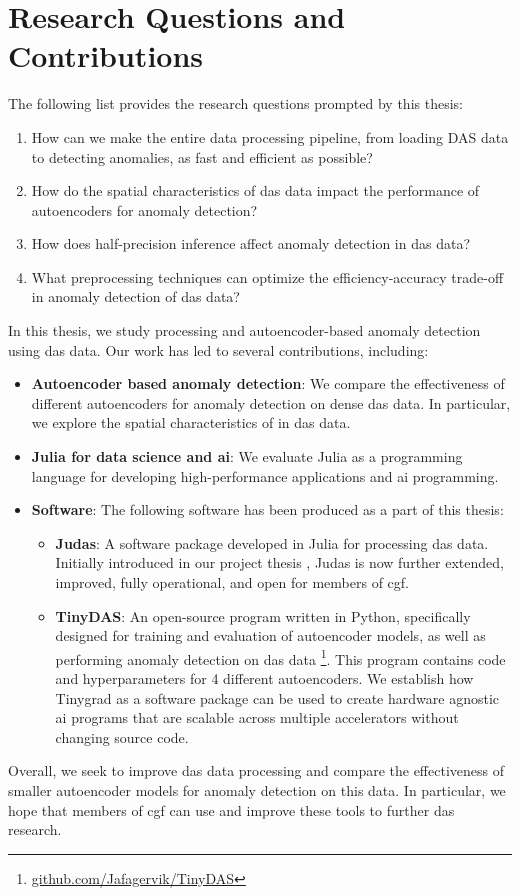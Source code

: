 \section{Research Questions and Contributions}
\label{intro:contribs}

The following list provides the research questions prompted by this thesis: 

\begin{enumerate}
    \item How can we make the entire data processing pipeline, from loading DAS data to detecting anomalies, as fast and efficient as possible?
    \item How do the spatial characteristics of \acrshort{das} data impact the performance of autoencoders for anomaly detection?
    \item How does half-precision inference affect anomaly detection in \acrshort{das} data?
    \item What preprocessing techniques can optimize the efficiency-accuracy trade-off in anomaly detection of \acrshort{das} data?
\end{enumerate}

In this thesis, we study processing and autoencoder-based anomaly detection using \acrshort{das} data. Our work has led to several contributions, including:

\begin{itemize}
    \item \textbf{Autoencoder based anomaly detection}: We compare the effectiveness of different autoencoders for anomaly detection on dense \acrshort{das} data. In particular, we explore the spatial characteristics of in \acrshort{das} data.
    \item \textbf{Julia for data science and \acrshort{ai}}: We evaluate Julia as a programming language for developing high-performance applications and \acrshort{ai} programming.
    \item \textbf{Software}: The following software has been produced as a part of this thesis:
    \begin{itemize}
        \item \textbf{Judas}: A software package developed in Julia for processing \acrshort{das} data. Initially introduced in our project thesis \cite{projthesis}, Judas is now further extended, improved, fully operational, and open for members of \acrshort{cgf}. 
        \item \textbf{TinyDAS}: An open-source program written in Python, specifically designed for training and evaluation of autoencoder models, as well as performing anomaly detection on \acrshort{das} data \footnote{\url{github.com/Jafagervik/TinyDAS}}. This program contains code and hyperparameters for 4 different autoencoders.  We establish how Tinygrad \cite{tinygrad} as a software package can be used to create hardware agnostic \acrshort{ai} programs that are scalable across multiple accelerators without changing source code. 
    \end{itemize}
\end{itemize}

Overall, we seek to improve \acrshort{das} data processing and compare the effectiveness of smaller autoencoder models for anomaly detection on this data. In particular, we hope that members of \acrshort{cgf} can use and improve these tools to further \acrshort{das} research.